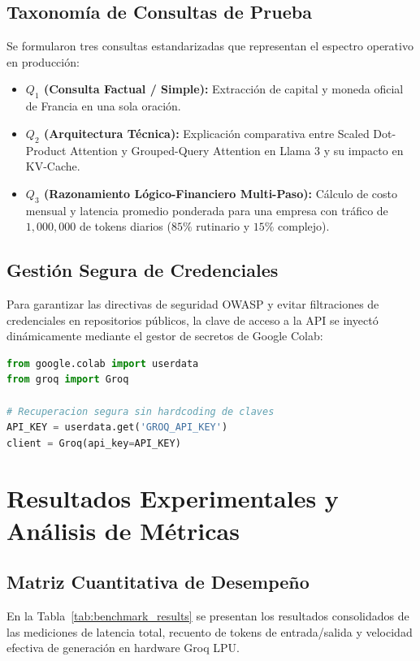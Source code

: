 \documentclass[12pt,letterpaper]{article}
\begin{document}
\subsection{Taxonomía de Consultas de Prueba}
Se formularon tres consultas estandarizadas que representan el espectro operativo en producción:
\begin{itemize}
    \item \textbf{$Q_1$ (Consulta Factual / Simple):} Extracción de capital y moneda oficial de Francia en una sola oración.
    \item \textbf{$Q_2$ (Arquitectura Técnica):} Explicación comparativa entre Scaled Dot-Product Attention y Grouped-Query Attention en Llama 3 y su impacto en KV-Cache.
    \item \textbf{$Q_3$ (Razonamiento Lógico-Financiero Multi-Paso):} Cálculo de costo mensual y latencia promedio ponderada para una empresa con tráfico de $1,000,000$ de tokens diarios ($85\%$ rutinario y $15\%$ complejo).
\end{itemize}

\subsection{Gestión Segura de Credenciales}
Para garantizar las directivas de seguridad OWASP y evitar filtraciones de credenciales en repositorios públicos, la clave de acceso a la API se inyectó dinámicamente mediante el gestor de secretos de Google Colab:

\begin{lstlisting}[language=Python, caption={Extracción segura de credenciales en Google Colab}]
from google.colab import userdata
from groq import Groq

# Recuperacion segura sin hardcoding de claves
API_KEY = userdata.get('GROQ_API_KEY')
client = Groq(api_key=API_KEY)
\end{lstlisting}

\section{Resultados Experimentales y Análisis de Métricas}

\subsection{Matriz Cuantitativa de Desempeño}
En la Tabla~\ref{tab:benchmark_results} se presentan los resultados consolidados de las mediciones de latencia total, recuento de tokens de entrada/salida y velocidad efectiva de generación en hardware Groq LPU.
\end{document}
